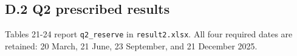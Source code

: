 \endgroup

\subsection*{D.2 Q2 prescribed results}\label{d.2-q2-prescribed-results}

Tables 21-24 report \nolinkurl{q2_reserve} in \nolinkurl{result2.xlsx}. All four required dates are retained: 20 March, 21 June, 23 September, and 21 December 2025.

\Needspace{107.7pt}
\begingroup
\fontsize{8.3}{9.96}\selectfont
\setlength{\tabcolsep}{3.2pt}
\renewcommand{\arraystretch}{1.12}
\setlength{\LTleft}{0pt plus 1fill}\setlength{\LTright}{0pt plus 1fill}
\setlength{\LTcapwidth}{\linewidth}

